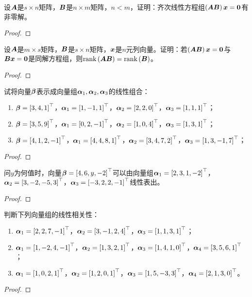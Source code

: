 \begin{problem}\label{problem-2.21}
设\(\mata\)是\(s\times n\)矩阵，\(\matb\)是\(n\times m\)矩阵，\(n<m\)，证明：齐次线性方程组\(\mypar{\mata\matb}\vecx=\veczero\)有非零解。
\end{problem}
\begin{proof}
\end{proof}

\begin{problem}\label{problem-2.22}
设\(\mata\)是\(m\times s\)矩阵，\(\matb\)是\(s\times n\)矩阵，\(\vecx\)是\(n\)元列向量。证明：若\(\mypar{\mata\matb}\vecx=\veczero\)与\(\matb\vecx=\veczero\)是同解方程组，则\(\rank{\mata\matb}=\rank{\matb}\)。
\end{problem}
\begin{proof}
\end{proof}

\begin{problem}\label{problem-2.23}
试将向量\(\vecbeta\)表示成向量组\(\vecal_1,\vecal_2,\vecal_3\)的线性组合：
\begin{enumerate}
    \item \(\vecbeta=\myvec{3,4,1}\)，\(\vecal_1=\myvec{1,-1,1}\)，\(\vecal_2=\myvec{2,2,0}\)，\(\vecal_3=\myvec{1,1,1}\)；
    \item \(\vecbeta=\myvec{3,5,9}\)，\(\vecal_1=\myvec{0,2,-1}\)，\(\vecal_2=\myvec{1,0,4}\)，\(\vecal_3=\myvec{1,3,1}\)；
    \item \(\vecbeta=\myvec{4,1,2,-1}\)，\(\vecal_1=\myvec{4,4,8,1}\)，\(\vecal_2=\myvec{3,4,7,2}\)，\(\vecal_3=\myvec{1,3,-1,7}\)；
\end{enumerate}
\end{problem}
\begin{proof}
\end{proof}

\begin{problem}\label{problem-2.24}
问\(y\)为何值时，向量\(\vecbeta=\myvec{4,6,y,-2}\)可以由向量组\(\vecal_1=\myvec{2,3,1,-2}\)，\(\vecal_2=\myvec{3,-2,-5,3}\)，\(\vecal_3=\myvec{-3,2,2,-1}\)线性表出。
\end{problem}
\begin{proof}
\end{proof}

\begin{problem}\label{problem-2.25}
判断下列向量组的线性相关性：
\begin{enumerate}
    \item \(\vecal_1=\myvec{2,2,7,-1}\)，\(\vecal_2=\myvec{3,-1,2,4}\)，\(\vecal_3=\myvec{1,1,3,1}\)；
    \item \(\vecal_1=\myvec{1,-2,4,-1}\)，\(\vecal_2=\myvec{1,3,2,1}\)，\(\vecal_3=\myvec{1,4,1,0}\)，\(\vecal_4=\myvec{3,5,6,1}\)；
    \item \(\vecal_1=\myvec{1,0,2,1}\)，\(\vecal_2=\myvec{1,2,0,1}\)，\(\vecal_3=\myvec{1,5,-3,3}\)，\(\vecal_4=\myvec{2,1,3,0}\)。
\end{enumerate}
\end{problem}
\begin{proof}
\end{proof}

